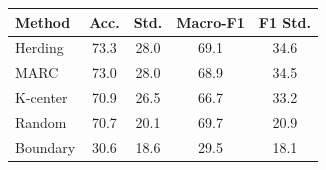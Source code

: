 \begin{tabular}{lcccc}
\toprule
Method & Acc. & Std. & Macro-F1 & F1 Std. \\
\midrule
Herding & 73.3 & 28.0 & 69.1 & 34.6 \\
MARC & 73.0 & 28.0 & 68.9 & 34.5 \\
K-center & 70.9 & 26.5 & 66.7 & 33.2 \\
Random & 70.7 & 20.1 & 69.7 & 20.9 \\
Boundary & 30.6 & 18.6 & 29.5 & 18.1 \\
\bottomrule
\end{tabular}
